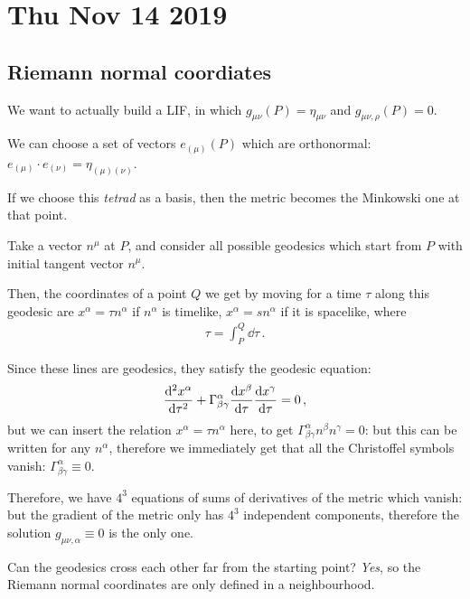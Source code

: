 \documentclass[main.tex]{subfiles}
\begin{document}
\section*{Thu Nov 14 2019}

\subsection{Riemann normal coordiates}

We want to actually build a LIF, in which \(g_{\mu \nu } (P ) = \eta_{\mu \nu }\) and \(g_{\mu \nu , \rho } (P)= 0\).

We can choose a set of vectors \(e_{(\mu )} (P)\) which are orthonormal: \(e_{(\mu )} \cdot e_{(\nu )} = \eta_{(\mu )(\nu )}\). 

If we choose this \emph{tetrad} as a basis, then the metric becomes the Minkowski one at that point.

Take a vector \(n^{\mu }\) at \(P\), and consider all possible geodesics which start from \(P\) with initial tangent vector \(n^{\mu }\).

Then, the coordinates of a point \(Q\) we get by moving for a time \(\tau \) along this geodesic are \(x^{\alpha } = \tau n^{\alpha }\) if \(n^{\alpha }\) is timelike, \(x^{\alpha } = s n^{\alpha }\) if it is spacelike, where 
%
\begin{align}
  \tau = \int _{P}^{Q} \dd{\tau } 
\,.
\end{align}

Since these lines are geodesics, they satisfy the geodesic equation: 
%
\begin{align}
  \dv[2]{x^{\alpha }}{\tau } + \Gamma^{\alpha }_{\beta \gamma } \dv{x^{\beta }}{\tau } \dv{x^{\gamma }}{\tau } = 0
\,,
\end{align}
%
but we can insert the relation \(x^{\alpha } = \tau n^{\alpha }\) here, to get \(\Gamma^{\alpha }_{\beta \gamma } n^{\beta } n^{\gamma }=0\): but this can be written for any \(n^{\alpha }\), therefore we immediately get that all the Christoffel symbols vanish: \(\Gamma^{ \alpha }_{\beta \gamma } \equiv 0\). 

Therefore, we have \(4^{3}\) equations of sums of derivatives of the metric which vanish: but the gradient of the metric only has \(4^{3}\) independent components, therefore the solution \(g_{\mu \nu , \alpha } \equiv 0\) is the only one.

Can the geodesics cross each other far from the starting point? \emph{Yes}, so the Riemann normal coordinates are only defined in a neighbourhood.
\end{document}
